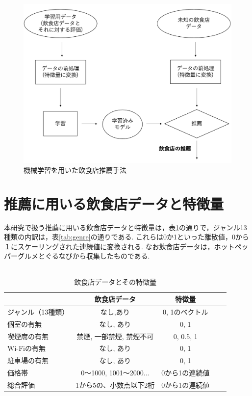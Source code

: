 \documentclass[12pt,a4j]{jreport}
\begin{document}
\begin{figure}[htbp]
  \begin{center}
    \includegraphics[width=13cm]{fig1.png}
    \caption{機械学習を用いた飲食店推薦手法}
    \label{fig1}
  \end{center}
\end{figure}

\section{推薦に用いる飲食店データと特徴量}
本研究で扱う推薦に用いる飲食店データと特徴量は，表\ref{tab:feature_values}の通りで，ジャンル13種類の内訳は，表\ref{tab:genre}の通りである.
これらは0か1といった離散値，0から１にスケーリングされた連続値に変換される.
なお飲食店データは，ホットペッパーグルメとぐるなびから収集したものである.\\\\

\begin{table}[htbp]
  \begin{center}
    \begin{tabular}{|l|c|c|c|c|}\hline
       & \textbf{飲食店データ} & \textbf{特徴量} \\ \hline
      ジャンル（13種類） & なし,あり & 0, 1のベクトル \\ \hline
      個室の有無 & なし, あり & 0, 1 \\ \hline
      喫煙席の有無 & 禁煙, 一部禁煙, 禁煙不可 & 0, 0.5, 1 \\ \hline
      Wi-Fiの有無 & なし, あり & 0, 1 \\ \hline
      駐車場の有無 & なし, あり & 0, 1 \\ \hline
      価格帯 & 0〜1000, 1001〜2000... & 0から1の連続値 \\ \hline
      総合評価 & 1から5の、小数点以下2桁 & 0から1の連続値 \\ \hline
    \end{tabular}
  \end{center}
  \caption{飲食店データとその特徴量}
  \label{tab:feature_values}
\end{table}
\end{document}
